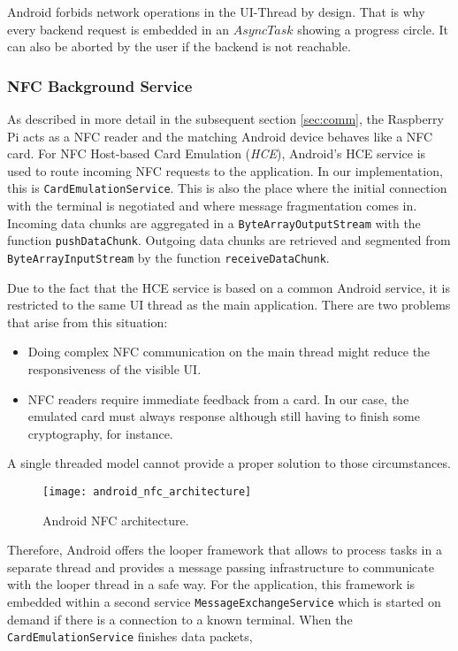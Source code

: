Android forbids network operations in the UI-Thread by design. That is why every backend request is embedded in an $AsyncTask$ showing a progress circle. It can also be aborted by the user if the backend is not reachable.

\subsubsection{NFC Background Service}
As described in more detail in the subsequent section \ref{sec:comm}, the Raspberry Pi acts as a NFC reader and the matching Android device behaves like a NFC card.
For NFC Host-based Card Emulation (\textit{HCE}), Android's HCE service is used to route incoming NFC requests to the \app application. In our implementation, this is \texttt{CardEmulationService}.
This is also the place where the initial connection with the terminal is negotiated and where message fragmentation comes in.
Incoming data chunks are aggregated in a \texttt{ByteArrayOutputStream} with the function \texttt{pushDataChunk}.
Outgoing data chunks are retrieved and segmented from \texttt{ByteArrayInputStream} by the function \texttt{receiveDataChunk}.

%
Due to the fact that the HCE service is based on a common Android service, it is restricted to the same UI thread as the main application.
There are two problems that arise from this situation:
%
\begin{itemize}
	\item Doing complex NFC communication on the main thread might reduce the responsiveness of the visible UI.
	\item NFC readers require immediate feedback from a card. In our case, the emulated card must always response although still having to finish some cryptography, for instance.
\end{itemize}
%
A single threaded model cannot provide a proper solution to those circumstances.

%
\begin{figure}[h]
    \centering
    \texttt{[image: android\_nfc\_architecture]}
    \caption{Android NFC architecture.}
    \label{fig:android:nfc_arch}
\end{figure}
%
Therefore, Android offers the looper framework that allows to process tasks in a separate thread and provides a message passing infrastructure to communicate with the looper thread in a safe way.
For the application, this framework is embedded within a second service \texttt{MessageExchangeService} which is started on demand if there is a connection to a known terminal.
When the \texttt{CardEmulationService} finishes data packets, 
